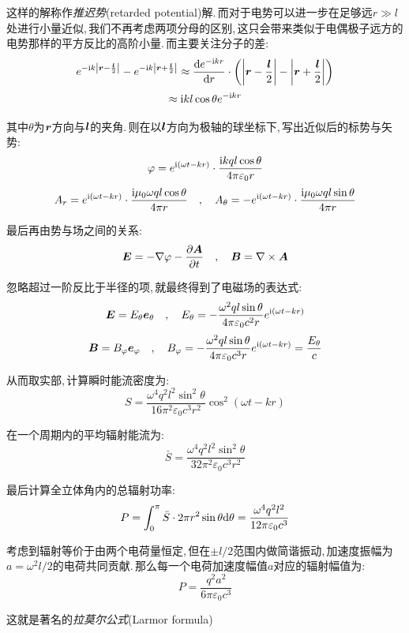 这样的解称作\emph{推迟势}(retarded potential)解.\,而对于电势可以进一步在足够远$r\gg l$处进行小量近似,\,我们不再考虑两项分母的区别,\,这只会带来类似于电偶极子远方的电势那样的平方反比的高阶小量.\,而主要关注分子的差:
\[e^{- {\rm i} k\left|\boldsymbol{r}-\frac{\boldsymbol{l}}{2}\right|}-e^{- {\rm i} k\left|\boldsymbol{r}+\frac{\boldsymbol{l}}{2}\right|}\approx \frac{\textrm{d} e^{-{\rm i} kr}}{\textrm{d} r}\cdot\left(\left|\boldsymbol{r}-\frac{\boldsymbol{l}}{2}\right|-\left|\boldsymbol{r}+\frac{\boldsymbol{l}}{2}\right|\right)\]
\[\approx {\rm i} kl\cos\theta e^{- {\rm i} kr}\]

其中$\theta$为$\boldsymbol{r}$方向与$\boldsymbol{l}$的夹角.\,则在以$\boldsymbol{l}$方向为极轴的球坐标下,\,写出近似后的标势与矢势:
\[\varphi=e^{{\rm i}(\omega t- kr)}\cdot\frac{{\rm i} kql\cos\theta}{4\pi\varepsilon_0 r} \]
\[A_r=e^{{\rm i}(\omega t- kr)}\cdot\frac{{\rm i} \mu_0\omega ql\cos\theta}{4\pi r}\quad ,\quad  A_\theta=-e^{{\rm i}(\omega t- kr)}\cdot\frac{{\rm i} \mu_0\omega ql\sin\theta}{4\pi r}\]

最后再由势与场之间的关系:
\[\boldsymbol{E}=-\nabla \varphi-\frac{\partial \boldsymbol{A}}{\partial t}\quad ,\quad\boldsymbol{B}=\nabla \times \boldsymbol{A}\]

忽略超过一阶反比于半径的项,\,就最终得到了电磁场的表达式:
\[\boldsymbol{E}=E_\theta \boldsymbol{e}_\theta\quad ,\quad E_\theta=-\frac{\omega^2 q l \sin\theta}{4\pi\varepsilon_0 c^2 r}e^{{\rm i}(\omega t- kr)}\]
\[\boldsymbol{B}=B_\varphi \boldsymbol{e}_\varphi\quad ,\quad B_\varphi=-\frac{\omega^2 q l \sin\theta}{4\pi\varepsilon_0 c^3 r}e^{{\rm i}(\omega t- kr)}=\frac{E_\theta}{c}\]

从而取实部,\,计算瞬时能流密度为:
\[S=\frac{\omega^4q^2l^2\sin^2\theta}{16\pi^2\varepsilon_0 c^3 r^2 }\cos^2(\omega t-kr)\]

在一个周期内的平均辐射能流为:
\[\bar{S}=\frac{\omega^4q^2l^2\sin^2\theta}{32\pi^2\varepsilon_0 c^3 r^2 }\]

最后计算全立体角内的总辐射功率:
\[P=\int_0^\pi \bar{S}\cdot 2\pi r^2\sin\theta\textrm{d} \theta=\frac{\omega^4q^2l^2}{12\pi\varepsilon_0 c^3  }\]

考虑到辐射等价于由两个电荷量恒定,\,但在$\pm l/2$范围内做简谐振动,\,加速度振幅为$a=\omega^2 l/2$的电荷共同贡献.\,那么每一个电荷加速度幅值$a$对应的辐射幅值为:
\[P=\frac{q^2a^2}{6\pi\varepsilon_0 c^3  }\]

这就是著名的\emph{拉莫尔公式}(Larmor formula)







